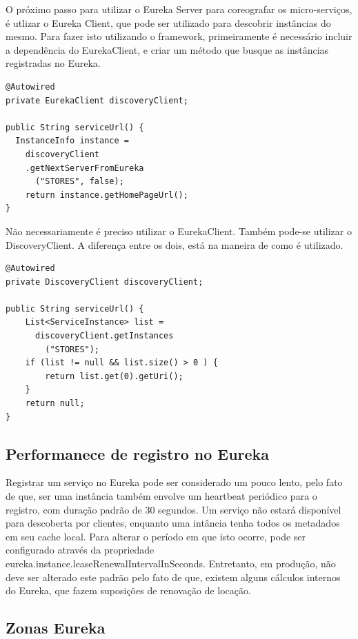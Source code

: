 \documentclass[journal]{IEEEtran}
\begin{document}
O próximo passo para utilizar o Eureka Server para coreografar os micro-serviços, é utlizar o Eureka Client, que pode ser utilizado para descobrir instâncias do mesmo. Para fazer isto utilizando o framework, primeiramente é necessário incluir a dependência do EurekaClient, e criar um método que busque as instâncias registradas no Eureka.

\begin{verbatim}
@Autowired
private EurekaClient discoveryClient;

public String serviceUrl() {
  InstanceInfo instance = 
    discoveryClient
    .getNextServerFromEureka
      ("STORES", false);
    return instance.getHomePageUrl();
}
\end{verbatim}

Não necessariamente é preciso utilizar o EurekaClient. Também pode-se utilizar o DiscoveryClient. A diferença entre os dois, está na maneira de como é utilizado.

\begin{verbatim}
@Autowired
private DiscoveryClient discoveryClient;

public String serviceUrl() {
    List<ServiceInstance> list = 
      discoveryClient.getInstances
        ("STORES");
    if (list != null && list.size() > 0 ) {
        return list.get(0).getUri();
    }
    return null;
}
\end{verbatim}

\subsection{Performanece de registro no Eureka}

Registrar um serviço no Eureka pode ser considerado um pouco lento, pelo fato de que, ser uma instância também envolve um heartbeat periódico para o registro, com duração padrão de 30 segundos. Um serviço não estará disponível para descoberta por clientes, enquanto uma intância tenha todos os metadados em seu cache local. Para alterar o período em que isto ocorre, pode ser configurado através da propriedade eureka.instance.leaseRenewalIntervalInSeconds. Entretanto, em produção, não deve ser alterado este padrão pelo fato de que, existem alguns cálculos internos do Eureka, que fazem suposições de renovação de locação.

\subsection{Zonas Eureka}
\end{document}
